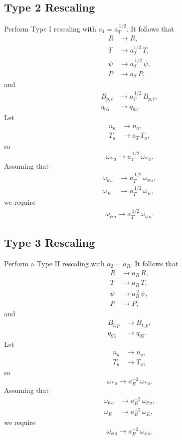 \documentclass[12pt]{article}
\begin{document}
\subsection{Type 2 Rescaling}
Perform Type I rescaling with $a_1 =a_T^{\,1/2}$. It follows that
\begin{align}
R&\rightarrow R,\\[0.5ex]
T&\rightarrow a_T^{1/2}\,T,\\[0.5ex]
\psi&\rightarrow a_T^{\,1/2}\,\psi,\\[0.5ex]
P&\rightarrow a_T\,P,
\end{align}
and 
\begin{align}
B_{p,t}&\rightarrow a_T^{\,1/2}\,B_{p,t},\\[0.5ex]
q_{95}&\rightarrow q_{95}.
\end{align}
Let
\begin{align}
n_a&\rightarrow n_a,\\[0.5ex]
T_a&\rightarrow a_T\,T_a,
\end{align}
so
\begin{equation}
\omega_{\ast\,a} \rightarrow a_T^{\,1/2}\,\omega_{\ast\,a}.
\end{equation}
Assuming that
\begin{align}
\omega_{\theta\,a}&\rightarrow a_T^{\,1/2}\,\omega_{\theta\,a},\\[0.5ex]
\omega_E&\rightarrow a_T^{\,1/2}\,\omega_E,
\end{align}
we require 
\begin{align}
\omega_{\phi\,a}\rightarrow a_T^{\,1/2}\,\omega_{\phi\,a}.
\end{align}

\subsection{Type 3 Rescaling}
Perform a Type II rescaling with $a_2=a_R$.
It follows that
\begin{align}
R&\rightarrow a_R\,R,\\[0.5ex]
T&\rightarrow a_R\,T,\\[0.5ex]
\psi&\rightarrow a_R^{\,2}\,\psi,\\[0.5ex]
P&\rightarrow P,
\end{align}
and 
\begin{align}
B_{t,p} &\rightarrow B_{t,p},\\[0.5ex]
q_{95}&\rightarrow q_{95}.
\end{align}
 Let
\begin{align}
n_a&\rightarrow n_a,\\[0.5ex]
T_a&\rightarrow T_a,
\end{align}
so
\begin{equation}
\omega_{\ast\,a} \rightarrow a_R^{-2}\,\omega_{\ast\,a}.
\end{equation}
Assuming that
\begin{align}
\omega_{\theta\,a}&\rightarrow a_R^{-2}\,\omega_{\theta\,a},\\[0.5ex]
\omega_E &\rightarrow a_R^{-2}\,\omega_E,
\end{align}
we require
\begin{equation}
\omega_{\phi\,a}\rightarrow a_R^{-2}\,\omega_{\phi\,a}.
\end{equation}
\end{document}
